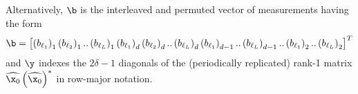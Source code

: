 %
Alternatively, $\b$ is the interleaved and permuted vector of 
measurements having the form
%
\begin{equation*}
  \b =  \left[  \left(b_{\ell_1}\right)_1 
                \left(b_{\ell_2}\right)_1
                .. %
                \left(b_{\ell_L}\right)_1
                \left(b_{\ell_1}\right)_d 
                \left(b_{\ell_2}\right)_d
                .. %
                \left(b_{\ell_L}\right)_d
                \left(b_{\ell_1}\right)_{d-1} 
                .. %
                \left(b_{\ell_L}\right)_{d-1}
                .. %
                \left(b_{\ell_1}\right)_2 
                .. %
                \left(b_{\ell_L}\right)_2
        \right]^T
\end{equation*}
%
and $\y$ indexes the $2\delta-1$ diagonals of the (periodically 
replicated) rank-1 matrix $\widehat{\x_0} \left( \widehat{\x_0} \right)^*$ in 
row-major notation. 

